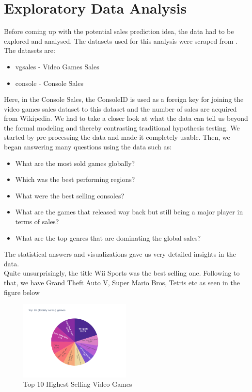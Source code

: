 \documentclass[conference]{IEEEtran}
\begin{document}
\section{Exploratory Data Analysis}
Before coming up with the potential sales prediction idea, the data had to be explored and analysed. The datasets used for this analysis were scraped from \cite{b2}. The datasets are:
\begin{itemize}
    \item vgsales - Video Games Sales \cite{b3}
    \item console - Console Sales \cite{b4}
\end{itemize}
Here, in the Console Sales, the ConsoleID is used as a foreign key for joining the video games sales dataset to this dataset and the number of sales are acquired from Wikipedia\cite{b5}. We had to take a closer look at what the data can tell us beyond the formal modeling and thereby contrasting traditional hypothesis testing. We started by pre-processing the data and made it completely usable. Then, we began answering many questions using the data such as:
\begin{itemize}
    \item What are the most sold games globally?
    \item Which was the best performing regions?
    \item What were the best selling consoles?
    \item What are the games that released way back but still being a major player in terms of sales?
    \item What are the top genres that are dominating the global sales?
\end{itemize}
The statistical answers and visualizations gave us very detailed insights in the data.\\
Quite unsurprisingly, the title Wii Sports was the best selling one. Following to that, we have Grand Theft Auto V, Super Mario Bros, Tetris etc as seen in the figure below\\
\begin{figure}[h]
    \centering
    \includegraphics[width=0.5\textwidth]{top10games.png}
    \caption{Top 10 Highest Selling Video Games}
\end{figure}
\end{document}
